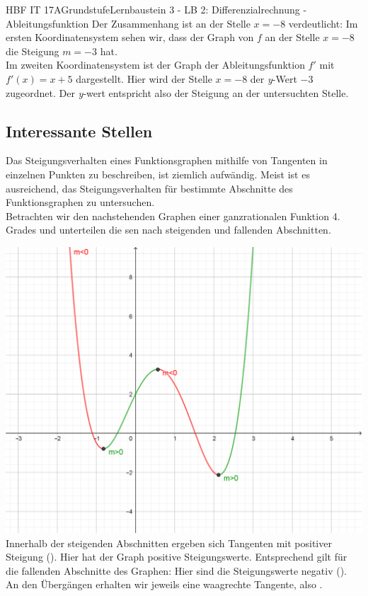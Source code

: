 \documentclass[11pt,twocolumn,oneside,openany,headings=optiontotoc,11pt,numbers=noenddot]{article}
\begin{document}
\begin{worksheet}{HBF IT 17A}{Grundstufe}{Lernbaustein 3 - LB 2: Differenzialrechnung - Ableitungsfunktion}
		Der Zusammenhang ist an der Stelle \(x=-8\) verdeutlicht: Im ersten Koordinatensystem sehen wir, dass der Graph von \(f\) an der Stelle \(x=-8\) die Steigung \(m=-3\) hat.\\
		Im zweiten Koordinatensystem ist der Graph der Ableitungsfunktion \(f'\) mit \(f'(x)= x+5\) dargestellt. Hier wird der Stelle \(x=-8\) der \textit{y}-Wert \(-3\) zugeordnet. Der \textit{y}-wert entspricht also der Steigung an der untersuchten Stelle.
		\subsection*{Interessante Stellen}
		Das Steigungsverhalten eines Funktionsgraphen mithilfe von Tangenten in einzelnen Punkten zu beschreiben, ist ziemlich aufwändig. Meist ist es ausreichend, das Steigungsverhalten für bestimmte Abschnitte des Funktionsgraphen zu untersuchen.\\
		Betrachten wir den nachstehenden Graphen einer ganzrationalen Funktion 4. Grades und unterteilen die
		sen nach steigenden und fallenden Abschnitten.\\
		\par\noindent
		\includegraphics[scale=0.26]{Bilder/fAbsch.png}\\
		Innerhalb der steigenden Abschnitten ergeben sich Tangenten mit positiver Steigung (\color{codegreen}{m>0}\normalcolor). Hier hat der Graph positive Steigungswerte. Entsprechend gilt für die fallenden Abschnitte des Graphen: Hier sind die Steigungswerte negativ (\color{red}{m<0}\normalcolor). An den Übergängen erhalten wir jeweils eine waagrechte Tangente, also \color{blue}{m=0}\normalcolor.\\

\end{worksheet}
\end{document}
